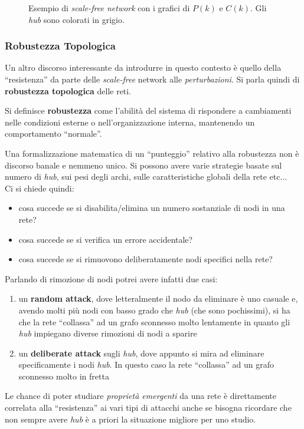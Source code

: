 \documentclass[a4paper,12pt, oneside]{book}
\begin{document}
\begin{figure}
  \caption{Esempio di \textit{scale-free network} con i grafici di $P(k)$ e
    $C(k)$. Gli \textit{hub} sono colorati in grigio.} 
  \label{fig:sfnet}
\end{figure}
\subsubsection{Robustezza Topologica}
Un altro discorso interessante da introdurre in questo contesto è quello della
``resistenza'' da parte delle \textit{scale-free} network alle
\textit{perturbazioni}. Si parla quindi di \textbf{robustezza topologica} delle
reti. 
\begin{definizione}
  Si definisce \textbf{robustezza} come l'abilità del sistema di rispondere a
  cambiamenti nelle condizioni esterne o nell'organizzazione interna, mantenendo
  un comportamento ``normale''.
\end{definizione}
Una formalizzazione matematica di un ``punteggio'' relativo alla robustezza non
è discorso banale e nemmeno unico. Si possono avere varie strategie basate sul
numero di \textit{hub}, sui pesi degli archi, sulle caratteristiche globali
della rete etc$\ldots$\\
Ci si chiede quindi:
\begin{itemize}
  \item cosa succede se si disabilita/elimina un numero sostanziale di nodi in
  una rete? 
  \item cosa succede se si verifica un errore accidentale?
  \item cosa succede se si rimuovono deliberatamente nodi specifici nella rete? 
\end{itemize}
Parlando di rimozione di nodi potrei avere infatti due casi:
\begin{enumerate}
  \item un \textbf{random attack}, dove letteralmente il nodo da eliminare è uno
  casuale e, avendo molti più nodi con basso grado che \textit{hub} (che sono
  pochissimi), si ha che la rete ``collassa'' ad un grafo sconnesso molto
  lentamente in quanto gli \textit{hub} impiegano diverse rimozioni di nodi a
  sparire 
  \item un \textbf{deliberate attack} sugli \textit{hub}, dove appunto si mira
  ad eliminare specificamente i nodi \textit{hub}. In questo caso la rete
  ``collassa'' ad un grafo sconnesso molto in fretta
\end{enumerate}
Le chance di poter studiare \textit{proprietà emergenti} da una rete è
direttamente correlata alla ``resistenza'' ai vari tipi di attacchi anche se
bisogna ricordare che non sempre avere \textit{hub} è a priori la situazione
migliore per uno studio.
\end{document}
